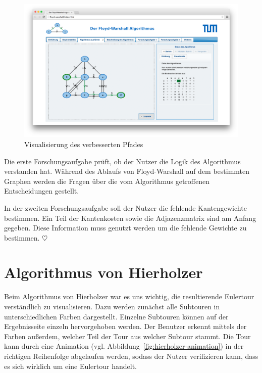 \begin{figure}[h!]
	\centering
	\includegraphics[width=\textwidth]{figures/fw-matrix}
	\caption[Floyd-Warshall: Matrix]{Visualisierung des verbesserten Pfades}\label{fig:fw-matrix}
\end{figure}

Die erste Forschungsaufgabe prüft, ob der Nutzer die Logik des Algorithmus verstanden hat. Während des Ablaufs von Floyd-Warshall auf dem bestimmten Graphen werden die Fragen über die vom Algorithmus getroffenen Entscheidungen gestellt.

In der zweiten Forschungsaufgabe soll der Nutzer die fehlende Kantengewichte bestimmen. Ein Teil der Kantenkosten sowie die Adjazenzmatrix sind am Anfang gegeben. Diese Information muss genutzt werden um die fehlende Gewichte zu bestimmen. \hfill$\heartsuit$

\section{Algorithmus von Hierholzer} %
Beim Algorithmus von Hierholzer war es uns wichtig, die resultierende Eulertour verständlich zu visualisieren. Dazu werden zunächst alle Subtouren in unterschiedlichen Farben dargestellt. Einzelne Subtouren können auf der Ergebnisseite einzeln hervorgehoben werden. Der Benutzer erkennt mittels der Farben außerdem, welcher Teil der Tour aus welcher Subtour stammt. Die Tour kann durch eine Animation (vgl. Abbildung~\ref{fig:hierholzer-animation}) in der richtigen Reihenfolge abgelaufen werden, sodass der Nutzer verifizieren kann, dass es sich wirklich um eine Eulertour handelt.

